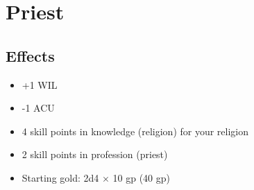 \section{Priest}\label{background:priest}

\subsection*{Effects}
\begin{itemize}
    \item +1 WIL
    \item -1 ACU
    \item 4 skill points in knowledge (religion) for your religion
    \item 2 skill points in profession (priest)
    \item Starting gold: 2d4 $\times$ 10 gp (40 gp)
\end{itemize}
